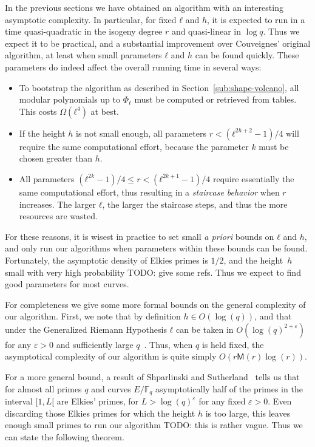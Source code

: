\documentclass{lms}
\newcommand{\todo}[1]{{\color{red}TODO: #1}}
\def\cout#1{\mathsf{#1}}
\newcommand{\F}{\mathbb{F}}
\newcommand{\MM}{\cout{M}}
\begin{document}
In the previous sections we have obtained an algorithm with an
interesting asymptotic complexity. In particular, for fixed $ℓ$ and
$h$, it is expected to run in a time quasi-quadratic in the isogeny
degree $r$ and quasi-linear in $\log q$. Thus we expect it to be
practical, and a substantial improvement over Couveignes' original
algorithm, at least when small parameters $ℓ$ and $h$ can be found
quickly. These parameters do indeed affect the overall running time in
several ways: 
\begin{itemize}
\item To bootstrap the algorithm as described in
  Section~\ref{sub:shape-volcano}, all modular polynomials up to $Φ_ℓ$
  must be computed or retrieved from tables. This costs $Ω(ℓ^4)$ at
  best.
\item If the height $h$ is not small enough, all parameters
  $r<(ℓ^{2h+2}-1)/4$ will require the same computational effort, because
  the parameter $k$ must be chosen greater than $h$.
\item All parameters $(ℓ^{2k}-1)/4≤r<(ℓ^{2k+1}-1)/4$ require
  essentially the same computational effort, thus resulting in a
  \emph{staircase behavior} when $r$ increases. The larger $ℓ$, the
  larger the staircase steps, and thus the more resources are wasted.
\end{itemize}

For these reasons, it is wisest in practice to set small \emph{a
  priori} bounds on $ℓ$ and $h$, and only run our algorithms when
parameters within these bounds can be found. Fortunately, the
asymptotic density of Elkies primes is $1/2$, and the height~$h$
small with very high probability \todo{give some refs}. Thus we expect
to find good parameters for most curves.

For completeness we give some more formal bounds on the general
complexity of our algorithm. First, we note that by definition
$h∈O(\log(q))$, and that under the Generalized Riemann Hypothesis $ℓ$
can be taken in $O(\log(q)^{2+ε})$ for any $ε>0$ and sufficiently
large $q$~\cite{satoh2002padic}. Thus, when $q$ is held fixed, the
asymptotical complexity of our algorithm is quite simply
$O(r\MM(r)\log(r))$.

For a more general bound, a result of Shparlinski and
Sutherland~\cite{shparlinski2014distribution} tells us that for almost
all primes $q$ and curves $E/\F_q$ asymptotically half of the primes
in the interval $[1,L[$ are Elkies' primes, for $L>\log(q)^ε$ for any
fixed $ε>0$. Even discarding those Elkies primes for which the height
$h$ is too large, this leaves enough small primes to run our algorithm
\todo{this is rather vague}. Thus we can state the following theorem.
\end{document}
